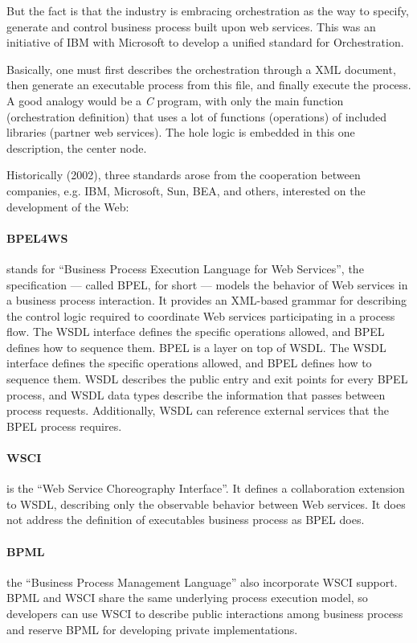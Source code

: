 But the fact is that the industry is embracing orchestration as the way to specify, generate and control business process built upon web services. This was an initiative of IBM with Microsoft to develop a unified standard for Orchestration.

Basically, one must first describes the orchestration through a XML document, then generate an executable process from this file, and finally execute the process. A good analogy would be a \emph{C} program, with only the main function (orchestration definition) that uses a lot of functions (operations) of included libraries (partner web services). The hole logic is embedded in this one description, the center node. 

Historically (2002), three standards arose from the cooperation between companies, e.g. IBM, Microsoft, Sun, BEA, and others, interested on the development of the Web:

\paragraph{BPEL4WS} 
stands for ``Business Process Execution Language for Web Services'', the specification — called BPEL, for short — models the behavior of Web services in a business process interaction. It provides an XML-based grammar for describing the control logic required to coordinate Web services participating in a process flow. The WSDL interface defines the specific operations allowed, and BPEL defines how to sequence them. BPEL is a layer on top of WSDL. The WSDL interface defines the specific operations allowed, and BPEL defines how to sequence them. WSDL describes the public entry and exit points for every BPEL process, and WSDL data types describe the information that passes between process requests. Additionally, WSDL can reference external services that the BPEL process requires.

\paragraph{WSCI}
is the ``Web Service Choreography Interface''. It defines a collaboration extension to WSDL, describing only the observable behavior between Web services. It does not address the definition of executables business process as BPEL does.

\paragraph{BPML} 
the ``Business Process Management Language'' also incorporate WSCI support. BPML and WSCI share the same underlying process execution model, so developers can use WSCI to describe public interactions among business process and reserve BPML for developing private implementations.


